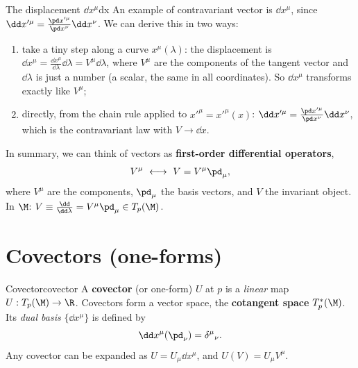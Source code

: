 \begin{example}{The displacement $\dd x^\mu$}{dx}
An example of contravariant vector is $\dd x^\mu$, since $\dd x'^\mu=\frac{\pd x'^\mu}{\pd x^\nu}\dd x^\nu$. We can derive this in two ways:
\begin{enumerate}[nosep]
\item take a tiny step along a curve $x^\mu(\lambda)$: the displacement is $\dd x^\mu=\frac{\dd x^\mu}{\dd\lambda}\dd\lambda=V^\mu\dd\lambda$, where $V^\mu$ are the components of the tangent vector and $\dd\lambda$ is just a number (a scalar, the same in all coordinates). So $\dd x^\mu$ transforms exactly like $V^\mu$;
\item directly, from the chain rule applied to $x'^\mu=x'^\mu(x)$: $\dd x'^\mu=\frac{\pd x'^\mu}{\pd x^\nu}\dd x^\nu$, which is the contravariant law with $V\to\dd x$.
\end{enumerate}
\end{example}

In summary, we can think of vectors as \textbf{first-order differential operators},
\begin{equation}
  V^\mu\ \longleftrightarrow\ V=V^\mu\pd_\mu,
\end{equation}
where $V^\mu$ are the components, $\pd_\mu$ the basis vectors, and $V$ the invariant object. In $\M$: $V\equiv\frac{\dd}{\dd\lambda}=V^\mu\pd_\mu\in T_p(\M)$.

\section{Covectors (one-forms)}

\begin{definition}{Covector}{covector}
A \textbf{covector} (or one-form) $U$ at $p$ is a \emph{linear} map $U:T_p(\M)\to\R$. Covectors form a vector space, the \textbf{cotangent space} $T_p^*(\M)$. Its \emph{dual basis} $\{\dd x^\mu\}$ is defined by
\begin{equation}
  \dd x^\mu(\pd_\nu)=\delta^\mu{}_\nu .
\end{equation}
Any covector can be expanded as $U=U_\mu\dd x^\mu$, and $U(V)=U_\mu V^\mu$.
\end{definition}

